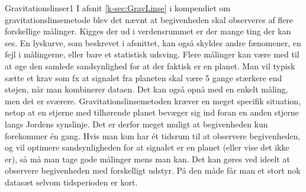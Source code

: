 \begin{opgave}{Gravitationslinser}{1}
I afsnit \ref{k-sec:GravLinse} i kompendiet om gravitationslinsemetode blev det nævnt at begivenheden skal observeres af flere forskellige målinger.
\opg Kigges der ud i verdensrummet er der mange ting der kan ses. En lyskurve, som beskrevet i afsnittet, kan også skyldes andre fænomener, en fejl i målingerne, eller bare et statistisk udsving. Flere målinger kan være med til at øge den samlede sandsynlighed for at der faktisk er en planet. Man vil typisk sætte et krav som fx at signalet fra planeten skal være 5 gange stærkere end støjen, når man kombinerer dataen. Det kan også opnå med en enkelt måling, men det er sværere. %
\opg Gravitationslinsemetoden kræver en meget specifik situation, netop at en stjerne med tilhørende planet bevæger sig ind foran en anden stjerne langs Jordens synslinje. %
Det er derfor meget muligt at begivenheden kun forekommer én gang. %
\opg Hvis man kun har ét tidsrum til at observere begivenheden, og vil optimere sandsynligheden for at signalet er en planet (eller vise det ikke er), så må man tage gode målinger mens man kan. Det kan gøres ved ideelt at observere begivenheden med forskelligt udstyr. På den måde får man et stort nok datasæt selvom tidsperioden er kort.
\end{opgave}
%
%
